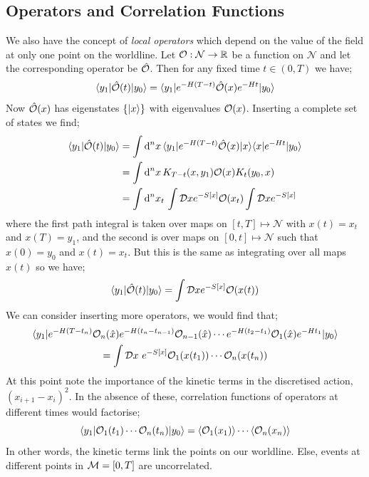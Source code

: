 \subsection{Operators and Correlation Functions}
We also have the concept of \emph{local operators} which depend on the value of the field at only one point on the worldline. Let $\mathcal{O} : \mathcal{N} \rightarrow \mathbb{R}$ be a function on $\mathcal{N}$ and let the corresponding operator be $\hat{\mathcal{O}}$. Then for any fixed time $t \in (0, T)$ we have;\footnotemark
{}
\begin{equation*}
\bra{y_1}\hat{\mO}(t)\ket{y_0} = \bra{y_1}e^{-H(T - t)}\hat{\mO}(x)e^{-Ht}\ket{y_0}
\end{equation*}
Now $\hat{\mathcal{O}}(x)$ has eigenstates $\set{\ket{x}}$ with eigenvalues $\mathcal{O}(x)$. Inserting a complete set of states we find;
\begin{align*}
\bra{y_1}\hat{\mO}(t)\ket{y_0} &= \int{\upd{^n x}\bra{y_1}e^{-H(T - t)}\hat{\mO}(x)\ket{x}\bra{x}e^{-Ht}\ket{y_0}} \\
&= \int{\upd{^n x}K_{T - t}(x, y_1)\mO(x)K_t(y_0, x)} \\
&= \int{\upd{^n x_t}\int{\mD x e^{-S[x]}\mO(x_t)\int{\mD x e^{-S[x]}}}}
\end{align*}
where the first path integral is taken over maps on $[t, T] \mapsto \mathcal{N}$ with $x(t) = x_t$ and $x(T) = y_1$, and the second is over maps on $[0, t] \mapsto \mathcal{N}$ such that $x(0) = y_0$ and $x(t) = x_t$. But this is the same as integrating over all maps $x(t)$ so we have;
\begin{equation}
\bra{y_1}\hat{\mO}(t)\ket{y_0} = \int{\mD x e^{-S[x]}\mO\left(x(t)\right)}
\end{equation}
We can consider inserting more operators, we would find that;
\begin{multline}
\bra{y_1}e^{-H(T - t_n)}\mO_n(\hat{x})e^{-H(t_{n} - t_{n - 1})}\mO_{n - 1}(\hat{x}) \cdots e^{-H(t_2 - t_1)}\mO_1(\hat{x})e^{-Ht_1}\ket{y_0} \\ = \int{\mD x\,\,e^{-S[x]}\mO_1\left(x(t_1)\right)\cdots\mO_n\left(x(t_n)\right)}
\end{multline}
At this point note the importance of the kinetic terms in the discretised action, $(x_{i + 1} - x_{i})^2$. In the absence of these, correlation functions of operators at different times would factorise;
\begin{equation*}
\bra{y_1}\mO_1(t_1)\cdots\mO_n(t_n)\ket{y_0} = \left< \mO_{1}(x_1) \right>\cdots \left< \mO_{n}(x_n) \right>
\end{equation*}
In other words, the kinetic terms link the points on our worldline. Else, events at different points in $\mathcal{M} = [0, T]$ are uncorrelated. 
